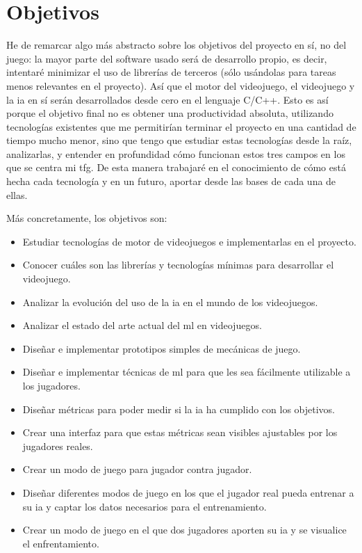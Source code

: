 
\chapter{Objetivos}
\label{objetivos} 
He de remarcar algo más abstracto sobre los objetivos del proyecto en sí, no del juego: la mayor parte del software usado será de desarrollo propio, es decir, intentaré minimizar el uso de librerías de terceros (sólo usándolas para tareas menos relevantes en el proyecto). Así que el motor del videojuego, el videojuego y la \gls{ia} en sí serán desarrollados desde cero en el lenguaje C/C++. Esto es así porque el objetivo final no es obtener una productividad absoluta, utilizando tecnologías existentes que me permitirían terminar el proyecto en una cantidad de tiempo mucho menor, sino que tengo que estudiar estas tecnologías desde la raíz, analizarlas, y entender en profundidad cómo funcionan estos tres campos en los que se centra mi \gls{tfg}. De esta manera trabajaré en el conocimiento de cómo está hecha cada tecnología y en un futuro, aportar desde las bases de cada una de ellas.

Más concretamente, los objetivos son:
\begin{itemize}
	\item Estudiar tecnologías de motor de videojuegos e implementarlas en el proyecto.
	\item Conocer cuáles son las librerías y tecnologías mínimas para desarrollar el videojuego.
	\item Analizar la evolución del uso de la \gls{ia} en el mundo de los videojuegos.
	\item Analizar el estado del arte actual del \gls{ml} en videojuegos.
	\item Diseñar e implementar prototipos simples de mecánicas de juego.
	\item Diseñar e implementar técnicas de \gls{ml} para que les sea fácilmente utilizable a los jugadores.
	\item Diseñar métricas para poder medir si la \gls{ia} ha cumplido con los objetivos.
	\item Crear una interfaz para que estas métricas sean visibles ajustables por los jugadores reales.
	\item Crear un modo de juego para jugador contra jugador.
	\item Diseñar diferentes modos de juego en los que el jugador real pueda entrenar a su \gls{ia} y captar los datos necesarios para el entrenamiento.
	\item Crear un modo de juego en el que dos jugadores aporten su \gls{ia} y se visualice el enfrentamiento.
\end{itemize}